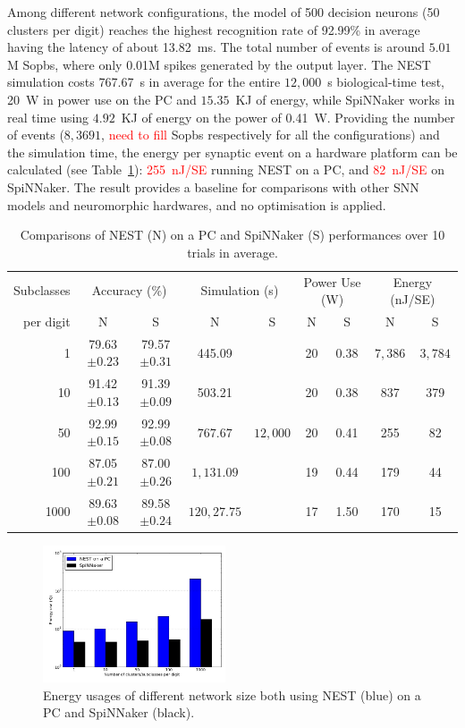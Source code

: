 \documentclass{frontiersENG} %
\begin{document}
Among different network configurations, the model of 500 decision neurons (50 clusters per digit) reaches the highest recognition rate of 92.99\% in average having the latency of about 13.82~ms.
The total number of events is around $5.01$M Sopbs, where only 0.01M spikes generated by the output layer. 
The NEST simulation costs 767.67~s in average for the entire $12,000$~s biological-time test, 20~W in power use on the PC and $15.35$~KJ of energy, while SpiNNaker works in real time using $4.92$~KJ of energy on the power of 0.41~W.
Providing the number of events ($8,3691$, \textcolor{red}{need to fill} Sopbs respectively for all the configurations) and the simulation time, the energy per synaptic event on a hardware platform can be calculated (see Table~\ref{tbl:compare}): 
\textcolor{red}{255~nJ/SE} running NEST on a PC, and \textcolor{red}{82~nJ/SE} on SpiNNaker.
The result provides a baseline for comparisons with other SNN models and neuromorphic hardwares, and no optimisation is applied.
\begin{table}[h]
	\caption{Comparisons of NEST (N) on a PC and SpiNNaker (S) performances over 10 trials in average.}
	\begin{center}
		\begin{tabular} {r|c|c|c|c|c|c|c|c}
			Subclasses
			&\multicolumn{2}{c|}{Accuracy (\%)}  &\multicolumn{2}{c|}{Simulation (s)}
			&\multicolumn{2}{c|}{Power Use (W)}
			&\multicolumn{2}{c}{Energy (nJ/SE)}   \\
			\cline{2-9}
			per digit
			& N & S & N & S & N & S & N & S\\
			\hline
			1 & 79.63$\pm0.23$ & 79.57$\pm0.31$ & 445.09 & \multirow{5}{*}{$12,000$} &20 & 0.38 & $7,386$  & $3,784$\\
			10 & 91.42$\pm0.13$ & 91.39$\pm0.09$ & 503.21 &   & 20  & 0.38 & 837 & 379 \\
			50 & 92.99$\pm0.15$ & 92.99$\pm0.08$ & $767.67$ &   & 20  & 0.41 & 255 & 82\\
			100 & 87.05$\pm0.21$ & 87.00$\pm0.26$ & $1,131.09$ &   &  19 & 0.44 & 179 & 44\\
			1000 & 89.63$\pm0.08$ & 89.58$\pm0.24$ & $120,27.75$ &   &  17  & 1.50 & 170 & 15\\
			
		\end{tabular}
		\label{tbl:compare}
	\end{center}
\end{table}

\begin{figure}[hbt!]
	\centering
	\includegraphics[width=0.48\textwidth]{fig8}
	\caption{Energy usages of different network size both using NEST (blue) on a PC and SpiNNaker (black).}
	\label{fig:energy}
\end{figure}
\end{document}
